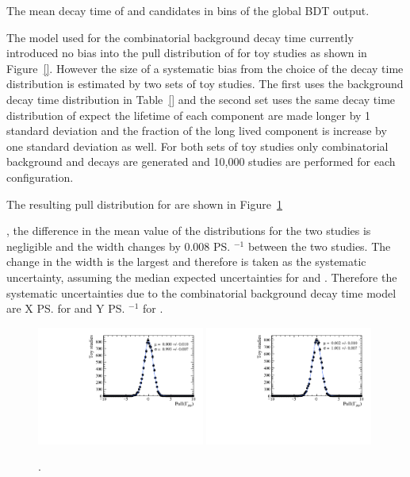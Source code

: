 {\begin{table}[htbp]
\begin{center}
\caption{The mean decay time of \bsmumu and \bhh candidates in bins of the global BDT output.}
\label{tab:MeanDecayTimeBDTBins}
\end{center}
\end{table}
The model used for the combinatorial background decay time currently introduced no bias into the pull distribution of \Gmumu for toy studies as shown in Figure~\ref{}. However the size of a systematic bias from the choice of the decay time distribution is estimated by two sets of toy studies. The first uses the background decay time distribution in Table~\ref{} and the second set uses the same decay time distribution of expect the lifetime of each component are made longer by 1 standard deviation and the fraction of the long lived component is increase by one standard deviation as well. For both sets of toy studies only combinatorial background and \bsmumu decays are generated and 10,000 studies are performed for each configuration. 

The resulting pull distribution for \Gmumu are shown in Figure~\ref{fig:CBGextreme}}, the difference in the mean value of the distributions for the two studies is negligible and the width changes by 0.008 \ps$^{-1}$ between the two studies. The change in the width is the largest and therefore is taken as the systematic uncertainty, assuming the median expected uncertainties for \Gmumu and \tmumu. Therefore the systematic uncertainties due to the combinatorial background decay time model are X \ps for \tmumu and Y \ps$^{-1}$ for \Gmumu.

\begin{figure}[htbp]
  \centering
    \includegraphics[width=0.49\textwidth]{./Figs/LifetimeSystematics/Gamma_pull_mass_pdf_Run1.pdf}
    \includegraphics[width=0.49\textwidth]{./Figs/LifetimeSystematics/Bs2MuMu_gamma_pull_CKM_extremeCBG_DT.pdf}

  \caption{.}
  \label{fig:CBGextreme}
\end{figure}


